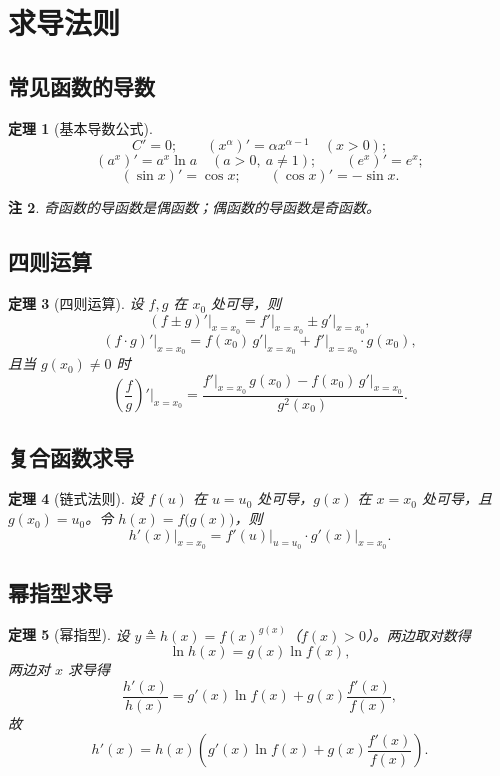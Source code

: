 \documentclass[UTF8,11pt]{ctexart}
\theoremstyle{cnthm}
\newtheorem{thm}{定理}[section]
\newtheorem{rem}[thm]{注}
\begin{document}
\section{求导法则}

\subsection{常见函数的导数}

\begin{thm}[基本导数公式]
\[
C'=0;\qquad (x^{\alpha})'=\alpha x^{\alpha-1}\quad(x>0);
\]
\[
(a^{x})'=a^{x}\ln a\quad(a>0,\ a\neq1);
\qquad (e^{x})'=e^{x};
\]
\[
(\sin x)'=\cos x;\qquad (\cos x)'=-\sin x.
\]
\end{thm}

\begin{rem}
奇函数的导函数是偶函数；偶函数的导函数是奇函数。
\end{rem}

\subsection{四则运算}

\begin{thm}[四则运算]
设 $f,g$ 在 $x_0$ 处可导，则
\[
(f\pm g)'\big|_{x=x_0}=f'\big|_{x=x_0}\pm g'\big|_{x=x_0},
\]
\[
(f\cdot g)'\big|_{x=x_0}=f(x_0)\,g'\big|_{x=x_0}+f'\big|_{x=x_0}\cdot g(x_0),
\]
且当 $g(x_0)\neq0$ 时
\[
\left(\frac fg\right)'\Big|_{x=x_0}
=\frac{f'\big|_{x=x_0}\,g(x_0)-f(x_0)\,g'\big|_{x=x_0}}{g^{2}(x_0)}.
\]
\end{thm}

\subsection{复合函数求导}

\begin{thm}[链式法则]
设 $f(u)$ 在 $u=u_0$ 处可导，$g(x)$ 在 $x=x_0$ 处可导，且 $g(x_0)=u_0$。令 $h(x)=f\bigl(g(x)\bigr)$，则
\[
h'(x)\big|_{x=x_0}=f'(u)\big|_{u=u_0}\cdot g'(x)\big|_{x=x_0}.
\]
\end{thm}

\subsection{幂指型求导}

\begin{thm}[幂指型]
设 $y\triangleq h(x)=f(x)^{g(x)}$（$f(x)>0$）。两边取对数得
\[
\ln h(x)=g(x)\ln f(x),
\]
两边对 $x$ 求导得
\[
\frac{h'(x)}{h(x)}=g'(x)\ln f(x)+g(x)\frac{f'(x)}{f(x)},
\]
故
\[
h'(x)=h(x)\left(g'(x)\ln f(x)+g(x)\frac{f'(x)}{f(x)}\right).
\]
\end{thm}
\end{document}
